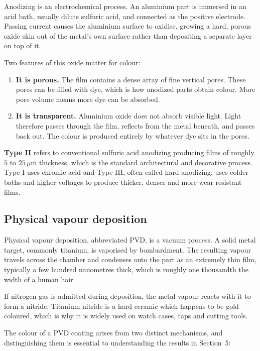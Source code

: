 \documentclass[11pt,a4paper]{article}
\newcommand{\um}{\ensuremath{\,\mu\mathrm{m}}}
\begin{document}
Anodizing is an electrochemical process. An aluminium part is immersed in an
acid bath, usually dilute sulfuric acid, and connected as the positive
electrode. Passing current causes the aluminium surface to oxidise, growing a
hard, porous oxide skin out of the metal's own surface rather than depositing a
separate layer on top of it.

Two features of this oxide matter for colour:

\begin{enumerate}[leftmargin=1.5em, itemsep=3pt]
\item \textbf{It is porous.} The film contains a dense array of fine vertical
pores. These pores can be filled with dye, which is how anodized parts obtain
colour. More pore volume means more dye can be absorbed.
\item \textbf{It is transparent.} Aluminium oxide does not absorb visible
light. Light therefore passes through the film, reflects from the metal
beneath, and passes back out. The colour is produced entirely by whatever dye
sits in the pores.
\end{enumerate}

\begin{defbox}
\textbf{Type II} refers to conventional sulfuric acid anodizing producing films
of roughly $5$ to $25\um$ thickness, which is the standard architectural and
decorative process. Type I uses chromic acid and Type III, often called hard
anodizing, uses colder baths and higher voltages to produce thicker, denser and
more wear resistant films.
\end{defbox}

\subsection{Physical vapour deposition}

Physical vapour deposition, abbreviated PVD, is a vacuum process. A solid metal
target, commonly titanium, is vaporised by bombardment. The resulting vapour
travels across the chamber and condenses onto the part as an extremely thin
film, typically a few hundred nanometres thick, which is roughly one thousandth
the width of a human hair.

If nitrogen gas is admitted during deposition, the metal vapour reacts with it
to form a nitride. Titanium nitride is a hard ceramic which happens to be gold
coloured, which is why it is widely used on watch cases, taps and cutting
tools.

The colour of a PVD coating arises from two distinct mechanisms, and
distinguishing them is essential to understanding the results in Section~5:
\end{document}
